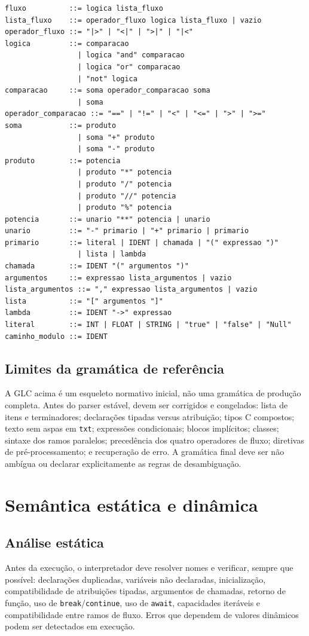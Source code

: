 \documentclass[12pt,a4paper]{article}
\begin{document}
\begin{lstlisting}
fluxo          ::= logica lista_fluxo
lista_fluxo    ::= operador_fluxo logica lista_fluxo | vazio
operador_fluxo ::= "|>" | "<|" | ">|" | "|<"
logica         ::= comparacao
                 | logica "and" comparacao
                 | logica "or" comparacao
                 | "not" logica
comparacao     ::= soma operador_comparacao soma
                 | soma
operador_comparacao ::= "==" | "!=" | "<" | "<=" | ">" | ">="
soma           ::= produto
                 | soma "+" produto
                 | soma "-" produto
produto        ::= potencia
                 | produto "*" potencia
                 | produto "/" potencia
                 | produto "//" potencia
                 | produto "%" potencia
potencia       ::= unario "**" potencia | unario
unario         ::= "-" primario | "+" primario | primario
primario       ::= literal | IDENT | chamada | "(" expressao ")"
                 | lista | lambda
chamada        ::= IDENT "(" argumentos ")"
argumentos     ::= expressao lista_argumentos | vazio
lista_argumentos ::= "," expressao lista_argumentos | vazio
lista          ::= "[" argumentos "]"
lambda         ::= IDENT "->" expressao
literal        ::= INT | FLOAT | STRING | "true" | "false" | "Null"
caminho_modulo ::= IDENT
\end{lstlisting}
\subsection{Limites da gramática de referência}
A GLC acima é um esqueleto normativo inicial, não uma gramática de produção completa. Antes do parser estável, devem ser corrigidos e congelados: lista de itens e terminadores; declarações tipadas versus atribuição; tipos C compostos; texto sem aspas em \texttt{txt}; expressões condicionais; blocos implícitos; classes; sintaxe dos ramos paralelos; precedência dos quatro operadores de fluxo; diretivas de pré-processamento; e recuperação de erro. A gramática final deve ser não ambígua ou declarar explicitamente as regras de desambiguação.
\section{Semântica estática e dinâmica}
\subsection{Análise estática}
Antes da execução, o interpretador deve resolver nomes e verificar, sempre que possível: declarações duplicadas, variáveis não declaradas, inicialização, compatibilidade de atribuições tipadas, argumentos de chamadas, retorno de função, uso de \texttt{break}/\texttt{continue}, uso de \texttt{await}, capacidades iteráveis e compatibilidade entre ramos de fluxo. Erros que dependem de valores dinâmicos podem ser detectados em execução.
\end{document}
